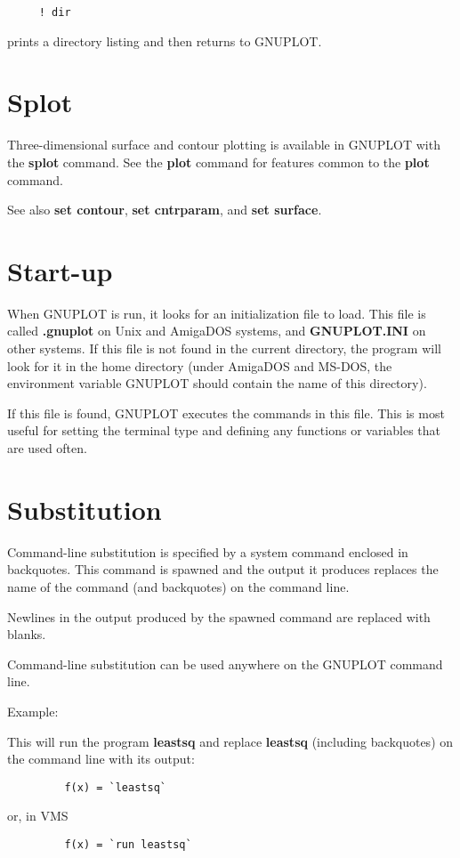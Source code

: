 \begin{verbatim}
     ! dir
\end{verbatim}

prints a directory listing and then returns to GNUPLOT.
\section{Splot}
Three-dimensional surface and contour plotting is available in
GNUPLOT with the {\bf splot} command. See the {\bf plot} command for features
common to the {\bf plot} command.

See also {\bf set contour}, {\bf set cntrparam}, and {\bf set surface}.
\section{Start-up}
When GNUPLOT is run, it looks for an initialization file to load.
This file is called {\bf .gnuplot} on Unix and AmigaDOS systems, and
{\bf GNUPLOT.INI} on other systems. If this file is not found in the
current directory, the program will look for it in the home directory
(under AmigaDOS and MS-DOS, the environment variable GNUPLOT should
contain the name of this directory).

If this file is found, GNUPLOT executes the commands in this file.
This is most useful for setting the terminal type and defining any
functions or variables that are used often.
\section{Substitution}
Command-line substitution is specified by a system command enclosed in
backquotes. This command is spawned and the output it produces
replaces the name of the command (and backquotes) on the command line.

Newlines in the output produced by the spawned command are replaced
with blanks.

Command-line substitution can be used anywhere on the GNUPLOT command
line.

Example:

This will run the program {\bf leastsq} and replace {\bf leastsq} (including
backquotes) on the command line with its output:

\begin{verbatim}
         f(x) = `leastsq`
\end{verbatim}

or, in VMS

\begin{verbatim}
         f(x) = `run leastsq`
\end{verbatim}
